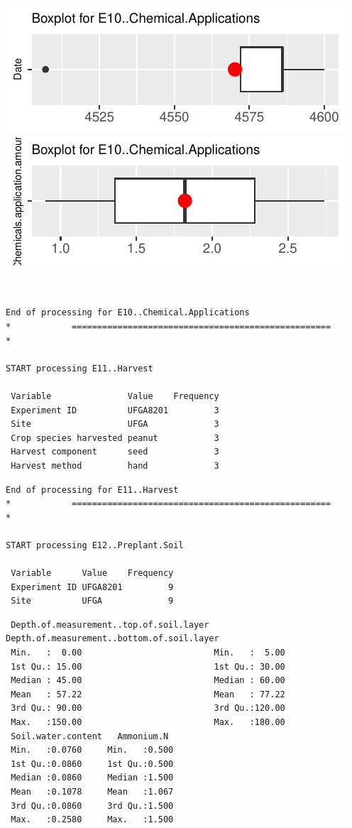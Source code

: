 \documentclass[
]{article}
\begin{document}
\includegraphics{FL_Crop_BMP_QA_single_dataset_files/figure-latex/check-content-of-sheets-13.pdf}
\includegraphics{FL_Crop_BMP_QA_single_dataset_files/figure-latex/check-content-of-sheets-14.pdf}

\begin{verbatim}


End of processing for E10..Chemical.Applications
*            ===================================================            *

START processing E11..Harvest

 Variable               Value    Frequency
 Experiment ID          UFGA8201         3
 Site                   UFGA             3
 Crop species harvested peanut           3
 Harvest component      seed             3
 Harvest method         hand             3
\end{verbatim}

\begin{verbatim}
End of processing for E11..Harvest
*            ===================================================            *

START processing E12..Preplant.Soil

 Variable      Value    Frequency
 Experiment ID UFGA8201         9
 Site          UFGA             9
\end{verbatim}

\begin{verbatim}
 Depth.of.measurement..top.of.soil.layer Depth.of.measurement..bottom.of.soil.layer
 Min.   :  0.00                          Min.   :  5.00                            
 1st Qu.: 15.00                          1st Qu.: 30.00                            
 Median : 45.00                          Median : 60.00                            
 Mean   : 57.22                          Mean   : 77.22                            
 3rd Qu.: 90.00                          3rd Qu.:120.00                            
 Max.   :150.00                          Max.   :180.00                            
 Soil.water.content   Ammonium.N   
 Min.   :0.0760     Min.   :0.500  
 1st Qu.:0.0860     1st Qu.:0.500  
 Median :0.0860     Median :1.500  
 Mean   :0.1078     Mean   :1.067  
 3rd Qu.:0.0860     3rd Qu.:1.500  
 Max.   :0.2580     Max.   :1.500  
\end{verbatim}
\end{document}
